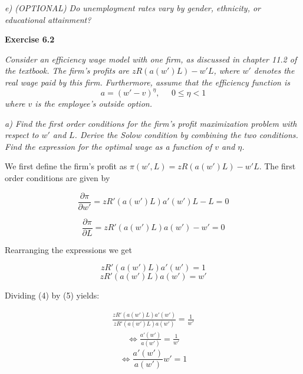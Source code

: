 \documentclass[11pt]{article} %
\begin{document}
\pagebreak
\textit{e) (OPTIONAL) Do unemployment rates vary by gender, ethnicity, or
educational attainment?}\par




\pagebreak
\textbf{\Large{Exercise 6.2}}

\textit{Consider an efficiency wage model with one firm, as discussed in chapter 11.2
of the textbook. The firm's profits are $zR\left(a(w')L\right)-w'L$, where $w'$ denotes the real wage paid by this firm. Furthermore, assume that the efficiency function is}
\begin{equation}
    a=(w'-v)^{\eta}, \;\;\;\;\; 0\leq\eta<1
\end{equation}
\textit{where $v$ is the employee's outside option.}

\textit{a) Find the first order conditions for the firm's profit maximization problem with respect to $w'$ and $L$. Derive the Solow condition by combining the two conditions. Find the expression for the optimal wage as a function of $v$ and $\eta$.}\par

\bigskip
We first define the firm's profit as $\pi(w',L)=zR\left(a(w')L\right)-w'L$. The first order conditions are given by

\bigskip
\begin{equation}
    \frac{\partial \pi}{\partial w'} = zR'\left(a(w')L\right) a'(w')L - L = 0    
\end{equation}

\begin{equation}
    \frac{\partial \pi}{\partial L} = zR'\left(a(w')L\right) a(w') - w' = 0    
\end{equation}

\bigskip
Rearranging the expressions we get

\bigskip
\begin{equation}
    zR'\left(a(w')L\right)a'(w') = 1
\end{equation}
\begin{equation}
    zR'\left(a(w')L\right)a(w') = w'
\end{equation}

\pagebreak
Dividing (4) by (5) yields:

\bigskip
\begin{align*}
    \frac{zR'\left(a(w')L\right)a'(w')}{zR'\left(a(w')L\right)a(w')} = \frac{1}{w'}
\end{align*}
\begin{align*}
    \Longleftrightarrow \frac{a'(w')}{a(w')} = \frac{1}{w'}
\end{align*}
\begin{equation}
    \Longleftrightarrow \frac{a'(w')}{a(w')}w' = 1
\end{equation}
\end{document}
